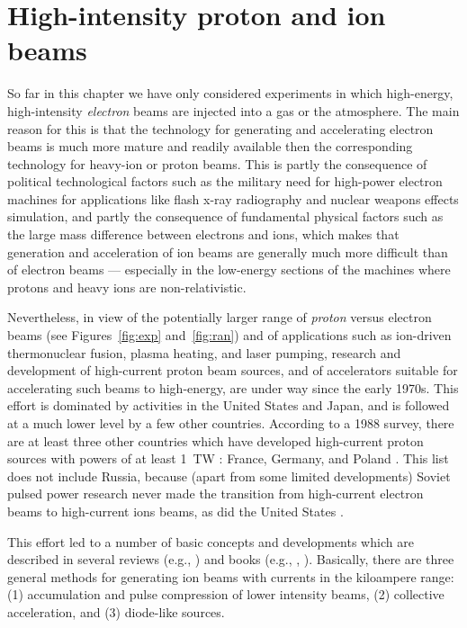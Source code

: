 \documentclass [12pt,a4paper,     ]{report} %
\begin{document}



\section{High-intensity proton and ion beams}
\label{hip:0}


So far in this chapter we have only considered experiments in which high-energy, high-intensity \emph{electron} beams are injected into a gas or the atmosphere.  The main reason for this is that the technology for generating and accelerating electron beams is much more mature and readily available then the corresponding technology for heavy-ion or proton beams.  This is partly the consequence of political technological factors such as the military need for high-power electron machines for applications like flash x-ray radiography and nuclear weapons effects simulation, and partly the consequence of fundamental physical factors such as the large mass difference between electrons and ions, which makes that generation and acceleration of ion beams are generally much more difficult than of electron beams --- especially in the low-energy sections of the machines where protons and heavy ions are non-relativistic.

   Nevertheless, in view of the potentially larger range of \emph{proton} versus electron beams (see Figures~\ref{fig:exp} and~\ref{fig:ran}) and of applications such as ion-driven thermonuclear fusion, plasma heating, and laser pumping, research and development of high-current proton beam sources, and of accelerators suitable for accelerating such beams to high-energy, are under way since the early 1970s.  This effort is dominated by activities in the United States and Japan, and is followed at a much lower level by a few other countries.  According to a 1988 survey, there are at least three other countries which have developed high-current proton sources with powers of at least 1~TW : France, Germany, and Poland \cite{COOK1988-}.  This list does not include Russia, because (apart from some limited developments) Soviet pulsed power research never made the transition from high-current electron beams to high-current ions beams, as did the United States \cite[p.69]{BYSTR1995B}.

   This effort led to a number of basic concepts and developments which are described in several reviews (e.g., \cite{NATIO1979-, GOLDE1981-, KEEFE1981-, YU---1996-}) and books (e.g., \cite{OLSON1979-}, \cite[Sec.~2.4 and Chap.~7]{MILLE1982-}).  Basically, there are three general methods for generating ion beams with currents in the kiloampere range: (1) accumulation and pulse compression of lower intensity beams, (2) collective acceleration, and (3) diode-like sources.
\end{document}
